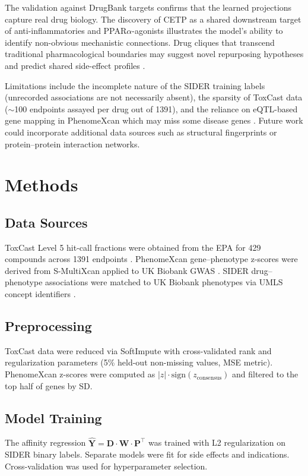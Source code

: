 \documentclass[11pt]{article}
\begin{document}
The validation against DrugBank targets confirms that the learned projections capture real drug biology. The discovery of CETP as a shared downstream target of anti-inflammatories and PPAR$\alpha$-agonists illustrates the model's ability to identify non-obvious mechanistic connections. Drug cliques that transcend traditional pharmacological boundaries may suggest novel repurposing hypotheses and predict shared side-effect profiles \citep{pushpakom2019drug}.

Limitations include the incomplete nature of the SIDER training labels (unrecorded associations are not necessarily absent), the sparsity of ToxCast data (${\sim}$100 endpoints assayed per drug out of 1391), and the reliance on eQTL-based gene mapping in PhenomeXcan which may miss some disease genes \citep{barbeira2019exploiting}. Future work could incorporate additional data sources such as structural fingerprints or protein--protein interaction networks.

\section{Methods}

\subsection{Data Sources}
ToxCast Level 5 hit-call fractions were obtained from the EPA for 429 compounds across 1391 endpoints \citep{richard2018toxcast}. PhenomeXcan gene--phenotype z-scores were derived from S-MultiXcan \citep{barbeira2018smultixcan} applied to UK Biobank GWAS \citep{bycroft2018ukbiobank, pividori2020phenomexcan}. SIDER drug--phenotype associations \citep{kuhn2016sider} were matched to UK Biobank phenotypes via UMLS concept identifiers \citep{bodenreider2004umls}.

\subsection{Preprocessing}
ToxCast data were reduced via SoftImpute \citep{mazumder2010softimpute} with cross-validated rank and regularization parameters (5\% held-out non-missing values, MSE metric). PhenomeXcan z-scores were computed as $|z| \cdot \mathrm{sign}(z_\mathrm{consensus})$ and filtered to the top half of genes by SD.

\subsection{Model Training}
The affinity regression $\hat{\mathbf{Y}} = \mathbf{D} \cdot \mathbf{W} \cdot \mathbf{P}^\top$ was trained with L2 regularization on SIDER binary labels. Separate models were fit for side effects and indications. Cross-validation was used for hyperparameter selection.
\end{document}
